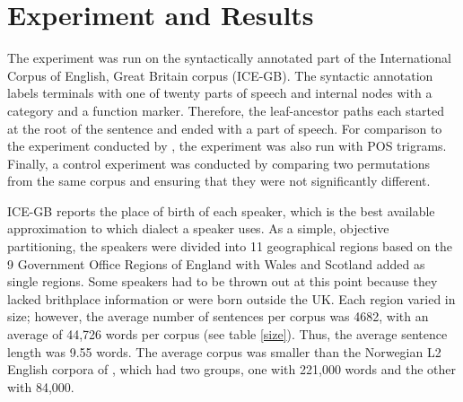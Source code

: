 \documentclass[11pt]{article}
\begin{document}

\section{Experiment and Results}

The experiment was run on the syntactically annotated part of the
International Corpus of English, Great Britain corpus (ICE-GB).
The syntactic annotation labels terminals with one of twenty parts of
speech and internal nodes with a category and a function
marker. Therefore, the leaf-ancestor paths each started at the root of
the sentence and ended with a part of speech.
For comparison to the experiment conducted by \cite{nerbonne06}, the
experiment was also run with POS trigrams. Finally, a control
experiment was conducted by comparing two permutations from the same
corpus and ensuring that they were not significantly different.

ICE-GB reports the place of birth of each speaker, which is the best
available approximation to which dialect a speaker uses. As a simple,
objective partitioning, the speakers were divided into 11 geographical
regions based on the 9 Government Office Regions of England with Wales
and Scotland added as single regions. Some speakers had to be thrown
out at this point because they lacked brithplace information or were
born outside the UK. Each region varied in size; however, the average
number of sentences per corpus was 4682, with an average of 44,726
words per corpus (see table \ref{size}).  Thus, the average
sentence length was 9.55 words.  The average corpus was smaller than
the Norwegian L2 English corpora of \cite{nerbonne06}, which had two
groups, one with 221,000 words and the other with 84,000.
\end{document}
